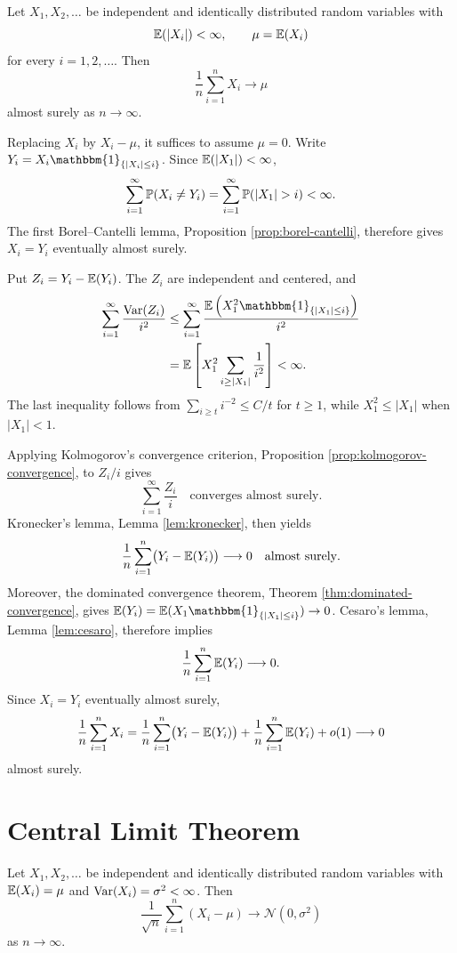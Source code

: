 \begin{theorembox}
    Let $X_1, X_2, \ldots$ be independent and identically distributed random variables with
    $$\mathbb{E}(|X_i|)<\infty,\qquad \mu=\mathbb{E}(X_i)$$
    for every $i=1,2,\ldots$. Then
    $$\frac{1}{n}\sum_{i=1}^{n} X_i \longrightarrow \mu$$
    almost surely as $n \to \infty$.
\end{theorembox}
\begin{proofbox}
    Replacing $X_i$ by $X_i-\mu$, it suffices to assume $\mu=0$.
    Write $Y_i=X_i\mathbbm{1}_{\{|X_i|\leq i\}}$. Since
    $\mathbb{E}(|X_1|)<\infty$,
    $$\sum_{i=1}^{\infty}\PP(X_i\neq Y_i)
    =\sum_{i=1}^{\infty}\PP(|X_1|>i)<\infty.$$
    The first Borel--Cantelli lemma, Proposition
    \ref{prop:borel-cantelli}, therefore gives
    $X_i=Y_i$ eventually almost surely.

    Put $Z_i=Y_i-\mathbb{E}(Y_i)$. The $Z_i$ are independent and centered,
    and
    $$\begin{aligned}
    \sum_{i=1}^{\infty}\frac{\Var(Z_i)}{i^2}
    &\leq\sum_{i=1}^{\infty}
    \frac{\EE\left(X_1^2\mathbbm{1}_{\{|X_1|\leq i\}}\right)}{i^2}\\
    &=\EE\left[X_1^2\sum_{i\geq |X_1|}\frac{1}{i^2}\right]
    <\infty.
    \end{aligned}$$
    The last inequality follows from
    $\sum_{i\geq t}i^{-2}\leq C/t$ for $t\geq1$, while
    $X_1^2\leq |X_1|$ when $|X_1|<1$.

    Applying Kolmogorov's convergence criterion, Proposition
    \ref{prop:kolmogorov-convergence}, to $Z_i/i$ gives
    $$\sum_{i=1}^{\infty}\frac{Z_i}{i}
    \quad\text{converges almost surely}.$$
    Kronecker's lemma, Lemma \ref{lem:kronecker}, then yields
    $$\frac{1}{n}\sum_{i=1}^{n}
    \bigl(Y_i-\mathbb{E}(Y_i)\bigr)\longrightarrow0
    \quad\text{almost surely}.$$
    Moreover, the dominated convergence theorem,
    Theorem \ref{thm:dominated-convergence}, gives
    $\EE(Y_i)=\EE(X_1\mathbbm{1}_{\{|X_1|\leq i\}})\to0$.
    Cesaro's lemma, Lemma \ref{lem:cesaro}, therefore implies
    $$\frac{1}{n}\sum_{i=1}^{n}\mathbb{E}(Y_i)\longrightarrow0.$$
    Since $X_i=Y_i$ eventually almost surely,
    $$\frac{1}{n}\sum_{i=1}^{n}X_i
    =\frac{1}{n}\sum_{i=1}^{n}
    \bigl(Y_i-\mathbb{E}(Y_i)\bigr)
    +\frac{1}{n}\sum_{i=1}^{n}\mathbb{E}(Y_i)+o(1)
    \longrightarrow0$$
    almost surely.
\end{proofbox}

\section{Central Limit Theorem}

\begin{theorembox}
    Let $X_1, X_2, \ldots$ be independent and identically distributed random variables with $\mathbb{E}(X_i) = \mu$ and $\operatorname{\mathrm{Var}}(X_i) = \sigma^2 < \infty$. Then
    $$\frac{1}{\sqrt{n}}\sum_{i=1}^{n} (X_i - \mu) \longrightarrow \mathcal{N}(0, \sigma^2)$$
    as $n \to \infty$.
\end{theorembox}
